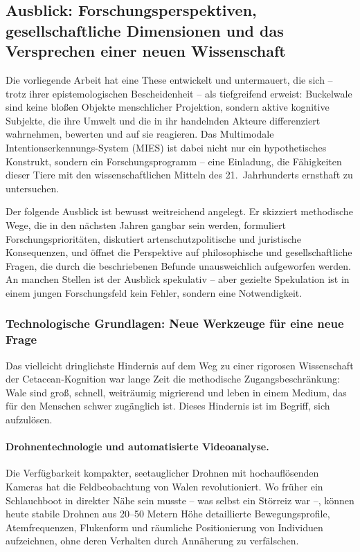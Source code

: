 ﻿\documentclass[12pt,a4paper]{article}
\theoremstyle{definition}
\theoremstyle{remark}
\begin{document}
\subsection{Ausblick: Forschungsperspektiven, gesellschaftliche Dimensionen und das Versprechen einer neuen Wissenschaft}
\label{sec:ausblick}

Die vorliegende Arbeit hat eine These entwickelt und untermauert, die sich -- trotz ihrer epistemologischen Bescheidenheit -- als tiefgreifend erweist: Buckelwale sind keine bloßen Objekte menschlicher Projektion, sondern aktive kognitive Subjekte, die ihre Umwelt und die in ihr handelnden Akteure differenziert wahrnehmen, bewerten und auf sie reagieren. Das Multimodale Intentionserkennungs-System (MIES) ist dabei nicht nur ein hypothetisches Konstrukt, sondern ein Forschungsprogramm -- eine Einladung, die Fähigkeiten dieser Tiere mit den wissenschaftlichen Mitteln des 21.\ Jahrhunderts ernsthaft zu untersuchen.

Der folgende Ausblick ist bewusst weitreichend angelegt. Er skizziert methodische Wege, die in den nächsten Jahren gangbar sein werden, formuliert Forschungsprioritäten, diskutiert artenschutzpolitische und juristische Konsequenzen, und öffnet die Perspektive auf philosophische und gesellschaftliche Fragen, die durch die beschriebenen Befunde unausweichlich aufgeworfen werden. An manchen Stellen ist der Ausblick spekulativ -- aber gezielte Spekulation ist in einem jungen Forschungsfeld kein Fehler, sondern eine Notwendigkeit.

\subsubsection{Technologische Grundlagen: Neue Werkzeuge für eine neue Frage}

Das vielleicht dringlichste Hindernis auf dem Weg zu einer rigorosen Wissenschaft der Cetacean-Kognition war lange Zeit die methodische Zugangsbeschränkung: Wale sind groß, schnell, weiträumig migrierend und leben in einem Medium, das für den Menschen schwer zugänglich ist. Dieses Hindernis ist im Begriff, sich aufzulösen.

\paragraph{Drohnentechnologie und automatisierte Videoanalyse.}
Die Verfügbarkeit kompakter, seetauglicher Drohnen mit hochauflösenden Kameras hat die Feldbeobachtung von Walen revolutioniert. Wo früher ein Schlauchboot in direkter Nähe sein musste -- was selbst ein Störreiz war --, können heute stabile Drohnen aus 20--50 Metern Höhe detaillierte Bewegungsprofile, Atemfrequenzen, Flukenform und räumliche Positionierung von Individuen aufzeichnen, ohne deren Verhalten durch Annäherung zu verfälschen.
\end{document}

